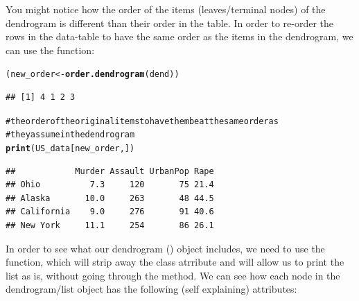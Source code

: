 \documentclass[shortnames,nojss,article]{jss}\usepackage{graphicx, color}
\makeatletter
\newcommand{\hlfunctioncall}[1]{\textcolor[rgb]{0.501960784313725,0,0.329411764705882}{\textbf{#1}}}%
\newcommand{\hlcomment}[1]{\textcolor[rgb]{0.180392156862745,0.6,0.341176470588235}{#1}}%
\newenvironment{kframe}{%
 \def\at@end@of@kframe{}%
 \ifinner\ifhmode%
  \def\at@end@of@kframe{\end{minipage}}%
  \begin{minipage}{\columnwidth}%
 \fi\fi%
 \def\FrameCommand##1{\hskip\@totalleftmargin \hskip-\fboxsep
 \colorbox{shadecolor}{##1}\hskip-\fboxsep
     \hskip-\linewidth \hskip-\@totalleftmargin \hskip\columnwidth}%
 \MakeFramed {\advance\hsize-\width
   \@totalleftmargin\z@ \linewidth\hsize
   \@setminipage}}%
 {\par\unskip\endMakeFramed%
 \at@end@of@kframe}
\newenvironment{knitrout}{}{} %
\makeatother
\begin{document}
You might notice how the order of the items (leaves/terminal nodes) of the dendrogram is different than their order in the table. In order to re-order the rows in the data-table to have the same order as the items in the dendrogram, we can use the  function:

\begin{knitrout}
\color{fgcolor}\begin{kframe}
\begin{alltt}
(new_order <- \hlfunctioncall{order.dendrogram}(dend))
\end{alltt}
\begin{verbatim}
## [1] 4 1 2 3
\end{verbatim}
\begin{alltt}
\hlcomment{# the order of the original items to have them be at the same order as}
\hlcomment{# they assume in the dendrogram}
\hlfunctioncall{print}(US_data[new_order, ])
\end{alltt}
\begin{verbatim}
##            Murder Assault UrbanPop Rape
## Ohio          7.3     120       75 21.4
## Alaska       10.0     263       48 44.5
## California    9.0     276       91 40.6
## New York     11.1     254       86 26.1
\end{verbatim}
\end{kframe}
\end{knitrout}



In order to see what our dendrogram () object includes, we need to use the  function, which will strip away the class atrribute and will allow us to print the list as is, without going through the  method. We can see how each node in the dendrogram/list object has the following (self explaining) attributes:
\end{document}

